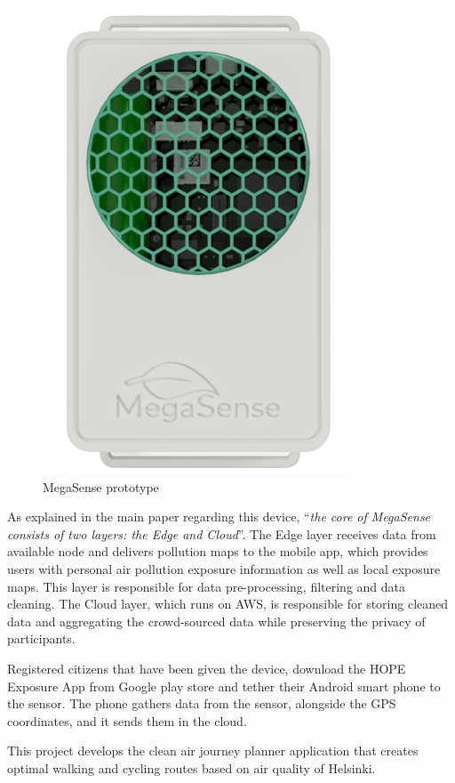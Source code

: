 			\noindent
			\begin{minipage}{0.35\textwidth}
				\begin{figure}[H]
					\centering
					\includegraphics[width=.8\textwidth]{resources/img/chap2/megasense}
					\caption{MegaSense prototype}
					\label{img:megasense_picture}
				\end{figure}
				\vspace{3mm}
			\end{minipage}%
			\hfill%
			\begin{minipage}{0.65\textwidth}\raggedright
				As explained in the main paper \cite{megasense} regarding this device, ``\textit{the core of MegaSense consists of two layers: the Edge and Cloud}''.
				The Edge layer receives data from available node and delivers pollution maps to the mobile app, which provides users with personal air pollution exposure	information as well as local exposure maps.
				This layer is responsible for data pre-processing, filtering and data cleaning.
				The Cloud layer, which runs on AWS, is responsible for storing cleaned data	and aggregating the crowd-sourced data while preserving the privacy of participants.
			\end{minipage}

			Registered citizens that have been given the device, download the HOPE Exposure App from Google play store and tether their Android smart phone to the sensor.
			The phone gathers data from the sensor, alongside the GPS coordinates, and it sends them in the cloud.
			
			This project develops the clean air journey	planner application that creates optimal walking and cycling routes based on air quality of Helsinki.